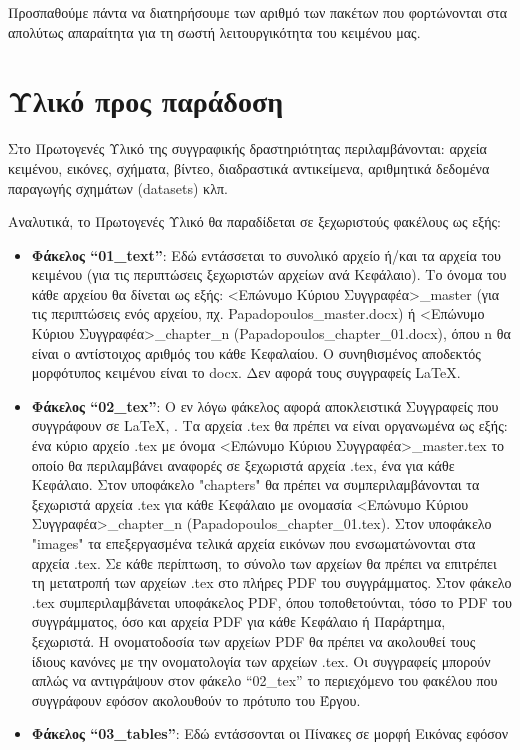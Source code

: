 Προσπαθούμε πάντα να διατηρήσουμε των αριθμό των πακέτων που φορτώνονται στα απολύτως
απαραίτητα για τη σωστή λειτουργικότητα του κειμένου μας.

\section{Υλικό προς παράδοση}\label{package}

Στο Πρωτογενές Υλικό της συγγραφικής δραστηριότητας περιλαμβάνονται: αρχεία
κειμένου, εικόνες, σχήματα, βίντεο, διαδραστικά αντικείμενα, αριθμητικά δεδομένα
παραγωγής σχημάτων (datasets) κλπ.

Αναλυτικά, το Πρωτογενές Υλικό θα παραδίδεται σε ξεχωριστούς φακέλους ως εξής:
\begin{itemize}
\item \textbf{Φάκελος “01\_text”}: Εδώ εντάσσεται το συνολικό αρχείο ή/και τα αρχεία του
κειμένου (για τις περιπτώσεις ξεχωριστών αρχείων ανά Κεφάλαιο). Το όνομα του
κάθε αρχείου θα δίνεται ως εξής: <Ε\-πώ\-νυ\-μο Κύριου Συγγραφέα>\_master (για τις
περιπτώσεις ενός αρχείου, πχ. Papadopoulos\_master.docx) ή <Επώ\-νυ\-μο Κύριου
Συγγραφέα>\_chapter\_n (Papadopoulos\_chapter\_01.docx), όπου n θα είναι ο
αντίστοιχος αριθμός του κάθε Κεφαλαίου. Ο συνηθισμένος αποδεκτός μορφότυπος
κειμένου είναι το docx. Δεν αφορά τους συγγραφείς \LaTeX.
\item \textbf{Φάκελος “02\_tex”}: Ο εν λόγω φάκελος αφορά αποκλειστικά Συγγραφείς που
συγγράφουν σε \LaTeX, \XeLaTeX. Τα αρχεία .tex θα πρέπει να είναι οργανωμένα ως
εξής: ένα κύριο αρχείο .tex με όνομα <Ε\-πώ\-νυ\-μο Κύριου Συγγραφέα>\_master.tex
το οποίο θα περιλαμβάνει αναφορές σε ξεχωριστά αρχεία .tex, ένα για κάθε
Κεφάλαιο. Στον υποφάκελο "chapters" θα πρέπει να συμπεριλαμβάνονται τα
ξεχωριστά αρχεία .tex για κάθε Κεφάλαιο με ονομασία <Επώνυμο Κύριου
Συγγραφέα>\_chapter\_n (Papadopoulos\_chapter\_01.tex). Στον υποφάκελο "images" τα επεξεργασμένα τελικά αρχεία εικόνων που ενσωματώνονται στα αρχεία .tex. Σε κάθε περίπτωση, το
σύνολο των αρχείων θα πρέπει να επιτρέπει τη μετατροπή των αρχείων .tex στο
πλήρες PDF του συγγράμματος. Στον φάκελο .tex συμπεριλαμβάνεται
υποφάκελος PDF, όπου τοποθετούνται, τόσο το PDF του συγγράμματος, όσο και
αρχεία PDF για κάθε Κεφάλαιο ή Παράρτημα, ξεχωριστά. Η ονοματοδοσία των
αρχείων PDF θα πρέπει να ακολουθεί τους ίδιους κανόνες με την ονοματολογία των
αρχείων .tex. Οι συγγραφείς μπορούν απλώς να αντιγράψουν στον φάκελο “02\_tex” το περιεχόμενο του φακέλου που συγγράφουν εφόσον ακολουθούν το πρότυπο του Έργου.
\item \textbf{Φάκελος “03\_tables”}: Εδώ εντάσσονται οι Πίνακες σε μορφή Εικόνας εφόσον

\end{itemize}
